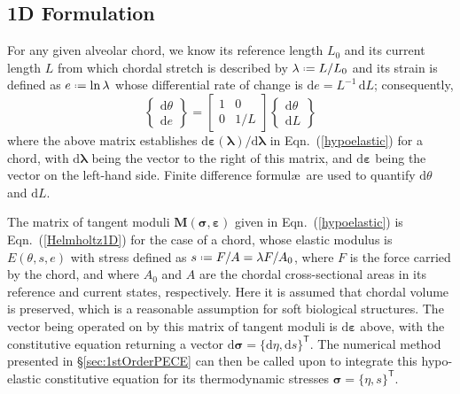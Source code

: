 \subsection{1D Formulation}

For any given alveolar chord, we know its reference length $L_0$ and its current length $L$ from which chordal stretch is described by $\lambda \defeq L / L_0$ and its strain is defined as $e \defeq \ln \lambda$ whose differential rate of change is $\mathrm{d} e = L^{-1} \, \mathrm{d} L$; consequently,
\begin{equation}
    \left\{ \begin{matrix}
    \mathrm{d} \theta \\ \mathrm{d} e
    \end{matrix} \right\} = \begin{bmatrix}
    1 & 0 \\ 0 & 1/L
    \end{bmatrix} \left\{ \begin{matrix}
    \mathrm{d} \theta \\ \mathrm{d} L
    \end{matrix} \right\}
\end{equation}
where the above matrix establishes $\mathrm{d} \boldsymbol{\varepsilon} ( \boldsymbol{\lambda} ) / \mathrm{d} \boldsymbol{\lambda}$ in Eqn.~(\ref{hypoelastic}) for a chord, with $\mathrm{d} \boldsymbol{\lambda}$ being the vector to the right of this matrix, and $\mathrm{d} \boldsymbol{\varepsilon}$ being the vector on the left-hand side.  Finite difference formul\ae\ are used to quantify $\mathrm{d} \theta$ and $\mathrm{d} L$.

The matrix of tangent moduli $\mathbf{M} ( \boldsymbol{\sigma} , \boldsymbol{\varepsilon} )$ given in Eqn.~(\ref{hypoelastic}) is Eqn.~(\ref{Helmholtz1D}) for the case of a chord, whose elastic modulus is $E(\theta , s , e)$ with stress defined as $s \defeq F/A = \lambda F / A_0$, where $F$ is the force carried by the chord, and where $A_0$ and $A$ are the chordal cross-sectional areas in its reference and current states, respectively.  Here it is assumed that chordal volume is preserved, which is a reasonable assumption for soft biological structures.  The vector being operated on by this matrix of tangent moduli is $\mathrm{d} \boldsymbol{\varepsilon}$ above, with the constitutive equation returning a vector $\mathrm{d} \boldsymbol{\sigma} = \{ \mathrm{d} \eta , \mathrm{d} s \}^{\mathsf{T}}$.  The numerical method presented in \S\ref{sec:1stOrderPECE} can then be called upon to integrate this hypo-elastic constitutive equation for its thermo\-dynamic stresses $\boldsymbol{\sigma} = \{ \eta , s \}^{\mathsf{T}}$.  


